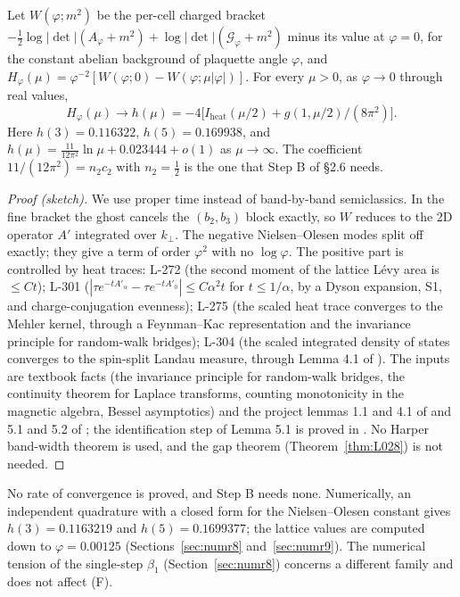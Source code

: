 \begin{theorem}\label{thm:L040}
Let $W(\varphi;m^2)$ be the per-cell charged bracket $-\frac12\log|\det|(A_\varphi+m^2)+\log|\det|(\mathcal G_\varphi+m^2)$ minus its value at $\varphi=0$, for the constant abelian background of plaquette angle $\varphi$, and $H_\varphi(\mu)=\varphi^{-2}[W(\varphi;0)-W(\varphi;\mu|\varphi|)]$. For every $\mu>0$, as $\varphi\to0$ through real values,
\[
H_\varphi(\mu)\to h(\mu)=-4\bigl[I_{\mathrm{heat}}(\mu/2)+g(1,\mu/2)/(8\pi^2)\bigr].
\]
Here $h(3)=0.116322$, $h(5)=0.169938$, and $h(\mu)=\frac{11}{12\pi^2}\ln\mu+0.023444+o(1)$ as $\mu\to\infty$. The coefficient $11/(12\pi^2)=n_2c_2$ with $n_2=\frac12$ is the one that Step B of  \S2.6 needs.
\end{theorem}
\begin{proof}[Proof (sketch)]
We use proper time instead of band-by-band semiclassics. In the fine bracket the ghost cancels the $(b_2,b_3)$ block exactly, so $W$ reduces to the 2D operator $A'$ integrated over $k_\perp$. The negative Nielsen--Olesen modes split off exactly; they give a term of order $\varphi^2$ with no $\log\varphi$. The positive part is controlled by heat traces: L-272 (the second moment of the lattice L\'evy area is $\le Ct$); L-301 ($|\tau e^{-tA'_\alpha}-\tau e^{-tA'_0}|\le C\alpha^2t$ for $t\le1/\alpha$, by a Dyson expansion, S1, and charge-conjugation evenness); L-275 (the scaled heat trace converges to the Mehler kernel, through a Feynman--Kac representation and the invariance principle for random-walk bridges); L-304 (the scaled integrated density of states converges to the spin-split Landau measure, through Lemma 4.1 of ). The inputs are textbook facts (the invariance principle for random-walk bridges, the continuity theorem for Laplace transforms, counting monotonicity in the magnetic algebra, Bessel asymptotics) and the project lemmas 1.1 and 4.1 of  and 5.1 and 5.2 of ; the identification step of Lemma 5.1 is proved in . No Harper band-width theorem is used, and the gap theorem (Theorem~\ref{thm:L028}) is not needed.
\end{proof}
No rate of convergence is proved, and Step B needs none. Numerically, an independent quadrature with a closed form for the Nielsen--Olesen constant gives $h(3)=0.1163219$ and $h(5)=0.1699377$; the lattice values are computed down to $\varphi=0.00125$ (Sections~\ref{sec:numr8} and~\ref{sec:numr9}). The numerical tension of the single-step $\beta_1$ (Section~\ref{sec:numr8}) concerns a different family and does not affect (F).

